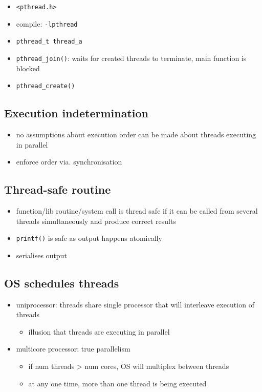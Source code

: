 \documentclass[10pt, multicolumn, a4paper]{article}
\begin{document}
\begin{multicols}{2}
	\begin{itemize}
	\item \verb|<pthread.h>|
	\item compile: \verb|-lpthread|
	\item \verb|pthread_t thread_a|
	\item \verb|pthread_join()|: waits for created threads to terminate, main function is blocked
	\item \verb|pthread_create()|
	\end{itemize}
	\subsection*{Execution indetermination}
	\begin{itemize}
	\item no assumptions about execution order can be made about threads executing in parallel
	\item enforce order via. synchronisation
	\end{itemize}
	\subsection*{Thread-safe routine}
	\begin{itemize}
	\item function/lib routine/system call is thread safe if it can be called from several threads simultaneously and produce correct results
	\item \verb|printf()| is safe as output happens atomically
	\item serialises output
	\end{itemize}
	\subsection*{OS schedules threads}
	\begin{itemize}
	\item uniprocessor: threads share single processor that will interleave execution of threads
		\begin{itemize}
		\item illusion that threads are executing in parallel
		\end{itemize}
	\item multicore processor: true parallelism
		\begin{itemize}
		\item if num threads > num cores, OS will multiplex between threads
		\item at any one time, more than one thread is being executed
		\end{itemize}
	\end{itemize}

\end{multicols}
\end{document}
